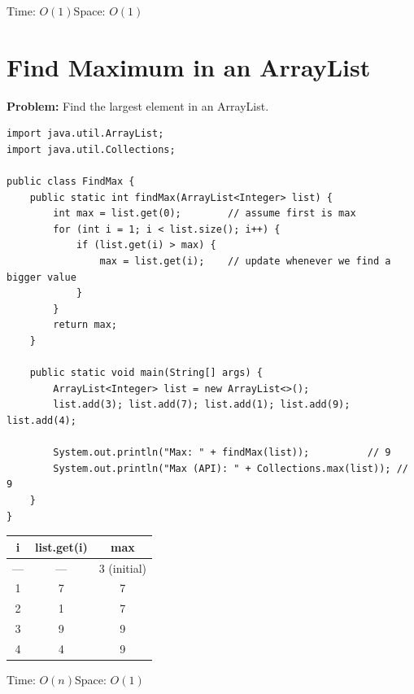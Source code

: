 \documentclass[12pt,a4paper,oneside]{book}
\begin{document}
\begin{complexity}
Time: $O(1)$\quad Space: $O(1)$
\end{complexity}

\section{Find Maximum in an ArrayList}

\textbf{Problem:} Find the largest element in an ArrayList.

\begin{lstlisting}[caption={Find Maximum --- Linear Scan}]
import java.util.ArrayList;
import java.util.Collections;

public class FindMax {
    public static int findMax(ArrayList<Integer> list) {
        int max = list.get(0);        // assume first is max
        for (int i = 1; i < list.size(); i++) {
            if (list.get(i) > max) {
                max = list.get(i);    // update whenever we find a bigger value
            }
        }
        return max;
    }

    public static void main(String[] args) {
        ArrayList<Integer> list = new ArrayList<>();
        list.add(3); list.add(7); list.add(1); list.add(9); list.add(4);

        System.out.println("Max: " + findMax(list));          // 9
        System.out.println("Max (API): " + Collections.max(list)); // 9
    }
}
\end{lstlisting}

\begin{dryrun}[list = {[3, 7, 1, 9, 4]}]
\begin{center}
\begin{tabular}{ccc}
\toprule
\textbf{i} & \textbf{list.get(i)} & \textbf{max}\\
\midrule
— & —  & 3 (initial)\\
1 & 7  & 7\\
2 & 1  & 7\\
3 & 9  & 9\\
4 & 4  & 9\\
\bottomrule
\end{tabular}
\end{center}
\end{dryrun}

\begin{complexity}
Time: $O(n)$\quad Space: $O(1)$
\end{complexity}
\end{document}
